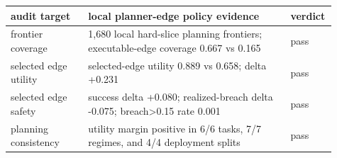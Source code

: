 \begin{tabular}{p{0.23\linewidth}p{0.60\linewidth}p{0.08\linewidth}}
\toprule
audit target & local planner-edge policy evidence & verdict \\
\midrule
frontier coverage & 1,680 local hard-slice planning frontiers; executable-edge coverage 0.667 vs 0.165 & pass \\
selected edge utility & selected-edge utility 0.889 vs 0.658; delta +0.231 & pass \\
selected edge safety & success delta +0.080; realized-breach delta -0.075; breach>0.15 rate 0.001 & pass \\
planning consistency & utility margin positive in 6/6 tasks, 7/7 regimes, and 4/4 deployment splits & pass \\
\bottomrule
\end{tabular}
